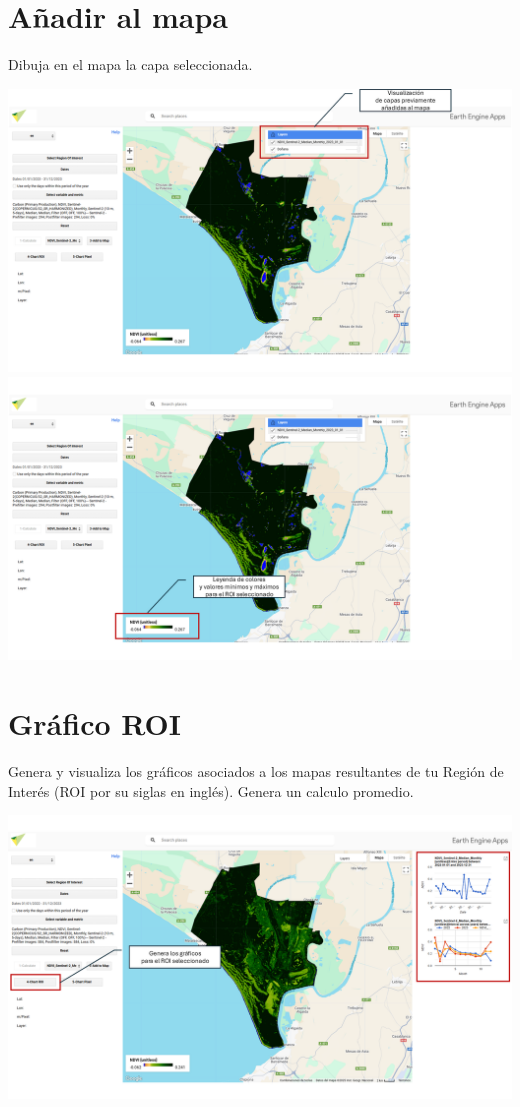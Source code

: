 \documentclass[
]{book}
\begin{document}
\section{\texorpdfstring{\textbf{Añadir al mapa}}{Añadir al mapa}}\label{auxf1adir-al-mapa}

Dibuja en el mapa la capa seleccionada.

\includegraphics{assets/layers_es2.png}
\includegraphics{assets/leyenda_es.png}

\section{\texorpdfstring{\textbf{Gráfico ROI}}{Gráfico ROI}}\label{gruxe1fico-roi}

Genera y visualiza los gráficos asociados a los mapas resultantes de tu Región de Interés (ROI por su siglas en inglés). Genera un calculo promedio.

\includegraphics{assets/graphs_es.png}
\end{document}
